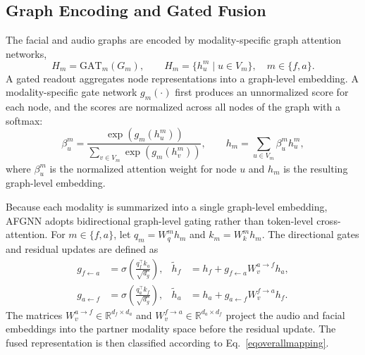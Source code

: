\documentclass[conference]{IEEEtran}
\begin{document}
\subsection{Graph Encoding and Gated Fusion}

The facial and audio graphs are encoded by modality-specific graph attention networks,
\begin{equation}
H_m=\mathrm{GAT}_m(G_m),\qquad
H_m=\{h^m_u\mid u\in V_m\},\quad m\in\{f,a\}.
\label{eqgat}
\end{equation}
A gated readout aggregates node representations into a graph-level embedding. A modality-specific gate network $g_m(\cdot)$ first produces an unnormalized score for each node, and the scores are normalized across all nodes of the graph with a softmax:
\begin{equation}
\beta^m_u=\frac{\exp(g_m(h^m_u))}{\sum_{v\in V_m}\exp(g_m(h^m_v))},
\qquad
h_m=\sum_{u\in V_m}\beta^m_u h^m_u,
\label{eqreadout}
\end{equation}
where $\beta^m_u$ is the normalized attention weight for node $u$ and $h_m$ is the resulting graph-level embedding.

Because each modality is summarized into a single graph-level embedding, AFGNN adopts bidirectional graph-level gating rather than token-level cross-attention. For $m\in\{f,a\}$, let $q_m=W_q^m h_m$ and $k_m=W_k^m h_m$. The directional gates and residual updates are defined as
\begin{equation}
\begin{aligned}
g_{f\leftarrow a}
&=\sigma\!\left(\frac{q_f^\top k_a}{\sqrt{d_g}}\right),
&
\tilde{h}_f
&=h_f+g_{f\leftarrow a}W_v^{a\rightarrow f}h_a,\\
g_{a\leftarrow f}
&=\sigma\!\left(\frac{q_a^\top k_f}{\sqrt{d_g}}\right),
&
\tilde{h}_a
&=h_a+g_{a\leftarrow f}W_v^{f\rightarrow a}h_f.
\end{aligned}
\label{eqgating}
\end{equation}
The matrices $W_v^{a\rightarrow f}\in\mathbb{R}^{d_f\times d_a}$ and $W_v^{f\rightarrow a}\in\mathbb{R}^{d_a\times d_f}$ project the audio and facial embeddings into the partner modality space before the residual update. The fused representation is then classified according to Eq.~\eqref{eqoverallmapping}.
\end{document}
